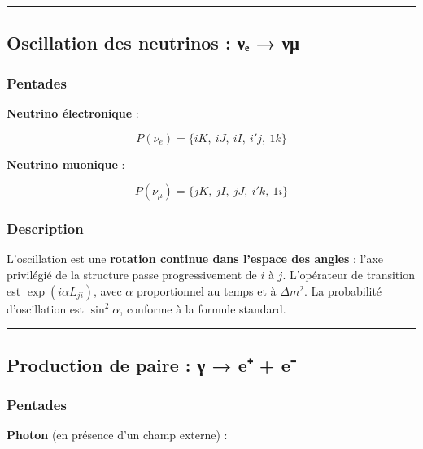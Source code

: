 \documentclass[11pt]{article}
\begin{document}
\begin{center}\rule{0.5\linewidth}{0.5pt}\end{center}

\hypertarget{oscillation-des-neutrinos-ux3bdux2091-ux3bdux3bc}{%
\subsection{Oscillation des neutrinos : νₑ →
νμ}\label{oscillation-des-neutrinos-ux3bdux2091-ux3bdux3bc}}

\hypertarget{pentades-2}{%
\subsubsection{Pentades}\label{pentades-2}}

\textbf{Neutrino électronique} :

\[
P(\nu_e) = \{ iK,\ iJ,\ iI,\ i'j,\ 1k \}
\]

\textbf{Neutrino muonique} :

\[
P(\nu_\mu) = \{ jK,\ jI,\ jJ,\ i'k,\ 1i \}
\]

\hypertarget{description-2}{%
\subsubsection{Description}\label{description-2}}

L'oscillation est une \textbf{rotation continue dans l'espace des
angles} : l'axe privilégié de la structure passe progressivement de
\(i\) à \(j\). L'opérateur de transition est \(\exp(i\alpha L_{ji})\),
avec \(\alpha\) proportionnel au temps et à \(\Delta m^2\). La
probabilité d'oscillation est \(\sin^2\alpha\), conforme à la formule
standard.

\begin{center}\rule{0.5\linewidth}{0.5pt}\end{center}

\hypertarget{production-de-paire-ux3b3-e-e}{%
\subsection{Production de paire : γ → e⁺ +
e⁻}\label{production-de-paire-ux3b3-e-e}}

\hypertarget{pentades-3}{%
\subsubsection{Pentades}\label{pentades-3}}

\textbf{Photon} (en présence d'un champ externe) :
\end{document}
